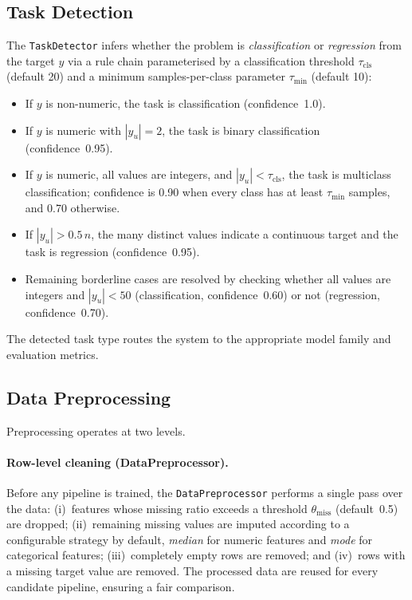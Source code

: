 \documentclass[conference]{llncs}
\begin{document}
   \subsection{Task Detection}
   \label{sec:task_detection}

   The \texttt{TaskDetector} infers whether the problem is \emph{classification} or \emph{regression} from the target $y$ via a rule chain parameterised by a classification threshold $\tau_\text{cls}$ (default 20) and a minimum samples-per-class parameter $\tau_\text{min}$ (default 10):

   \begin{itemize}
   \item If $y$ is non-numeric, the task is classification (confidence~1.0).
   \item If $y$ is numeric with $|y_u|=2$, the task is binary classification (confidence~0.95).
   \item If $y$ is numeric, all values are integers, and $|y_u| < \tau_\text{cls}$, the task is multiclass classification; confidence is 0.90 when every class has at least $\tau_\text{min}$ samples, and 0.70 otherwise.
   \item If $|y_u| > 0.5\,n$, the many distinct values indicate a continuous target and the task is regression (confidence~0.95).
   \item Remaining borderline cases are resolved by checking whether all values are integers and $|y_u| < 50$ (classification, confidence~0.60) or not (regression, confidence~0.70).
   \end{itemize}

   The detected task type routes the system to the appropriate model family and evaluation metrics.

   \subsection{Data Preprocessing}
   \label{sec:preprocessing}

   Preprocessing operates at two levels.

   \paragraph{Row-level cleaning (DataPreprocessor).}
   Before any pipeline is trained, the \texttt{DataPreprocessor} performs a single pass over the data:
   (i)~features whose missing ratio exceeds a threshold $\theta_\text{miss}$ (default~0.5) are dropped;
   (ii)~remaining missing values are imputed according to a configurable strategy by default, \emph{median} for numeric features and \emph{mode} for categorical features;
   (iii)~completely empty rows are removed; and
   (iv)~rows with a missing target value are removed.
   The processed data are reused for every candidate pipeline, ensuring a fair comparison.
\end{document}
